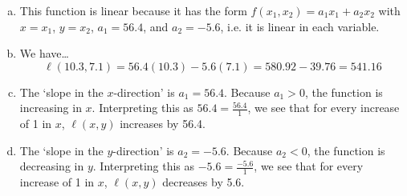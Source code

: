 \documentclass[11pt,letterpaper]{article}
\begin{document}
\sol
\begin{enumerate}[(a)]
\item This function is linear because it has the form $f(x_1, x_2)= a_1 x_1 + a_2 x_2$ with $x= x_1$, $y= x_2$, $a_1= 56.4$, and $a_2= -5.6$, i.e. it is linear in each variable. \pspace

\item We have\dots
	\[
	\ell(10.3, 7.1)= 56.4(10.3) - 5.6(7.1)= 580.92 - 39.76= 541.16
	\] \pspace

\item The `slope in the $x$-direction' is $a_1= 56.4$. Because $a_1 > 0$, the function is increasing in $x$. Interpreting this as $56.4= \frac{56.4}{1}$, we see that for every increase of 1 in $x$, $\ell(x, y)$ increases by 56.4. \pspace

\item The `slope in the $y$-direction' is $a_2= -5.6$. Because $a_2 < 0$, the function is decreasing in $y$. Interpreting this as $-5.6= \frac{-5.6}{1}$, we see that for every increase of 1 in $x$, $\ell(x, y)$ decreases by 5.6.
\end{enumerate}
\end{document}
